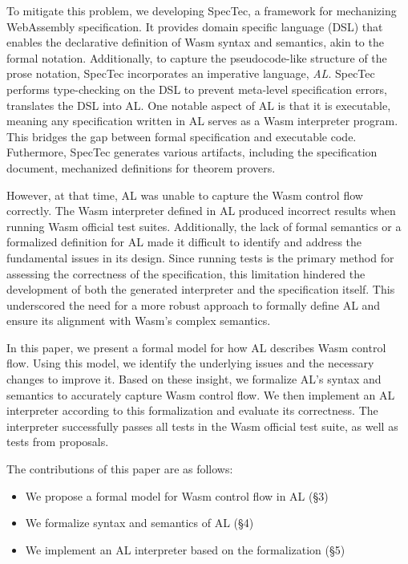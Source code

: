 To mitigate this problem, we  developing SpecTec, a framework for
mechanizing WebAssembly specification.
It provides domain specific language (DSL) that enables the declarative
definition of Wasm syntax and semantics, akin to the formal notation.
Additionally, to capture the pseudocode-like structure of the prose notation,
SpecTec incorporates an imperative language, \textit{AL}.
SpecTec performs type-checking on the DSL to prevent meta-level specification
errors, translates the DSL into AL.
One notable aspect of AL is that it is executable, meaning any specification
written in AL serves as a Wasm interpreter program.
This bridges the gap between formal specification and executable code.
Futhermore, SpecTec generates various artifacts, including the specification
document, mechanized definitions for theorem provers.


However, at that time, AL was unable to capture the Wasm control flow
correctly.
The Wasm interpreter defined in AL produced incorrect results when running Wasm
official test suites.
Additionally, the lack of formal semantics or a formalized definition for AL
made it difficult to identify and address the fundamental issues in its design.
Since running tests is the primary method for assessing the correctness of the
specification, this limitation hindered the development of both the generated
interpreter and the specification itself.
This underscored the need for a more robust approach to formally define AL and
ensure its alignment with Wasm's complex semantics.


In this paper, we present a formal model for how AL describes Wasm control flow.
Using this model, we identify the underlying issues and the necessary changes
to improve it.
Based on these insight, we formalize AL's syntax and semantics to accurately
capture Wasm control flow.
We then implement an AL interpreter according to this formalization and
evaluate its correctness.
The interpreter successfully passes all tests in the Wasm official test suite,
as well as tests from proposals.


The contributions of this paper are as follows:
\begin{itemize}
  \item We propose a formal model for Wasm control flow in AL (\S3)
  \item We formalize syntax and semantics of AL (\S4)
  \item We implement an AL interpreter based on the formalization (\S5)
\end{itemize}

